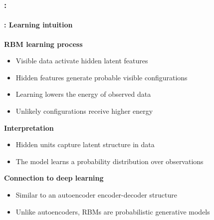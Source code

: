 \documentclass[xcolor=table]{beamer}
\begin{document}
	\begin{frame}
		\frametitle{\insertshortsubtitle: \insertsection}
		\framesubtitle{\insertsubsection: Learning intuition}
		
		\textbf{RBM learning process}
		
		\begin{itemize}
			\item Visible data activate hidden latent features
			\item Hidden features generate probable visible configurations
			\item Learning lowers the energy of observed data
			\item Unlikely configurations receive higher energy
		\end{itemize}
		
		\vspace{0.5em}
		
		\textbf{Interpretation}
		\begin{itemize}
			\item Hidden units capture latent structure in data
			\item The model learns a probability distribution over observations
		\end{itemize}
		
		\vspace{0.5em}
		
		\textbf{Connection to deep learning}
		\begin{itemize}
			\item Similar to an autoencoder encoder-decoder structure
			\item Unlike autoencoders, RBMs are probabilistic generative models
		\end{itemize}
		
	\end{frame}
	
\end{document}
